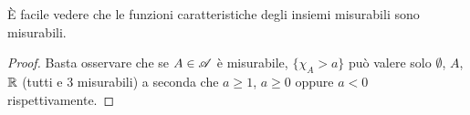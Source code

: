 \begin{remark}
	È facile vedere che le funzioni caratteristiche degli insiemi misurabili sono misurabili.
\end{remark}
\begin{proof}
	Basta osservare che se $A\in \mathscr A$ è misurabile, $\{ \chi_A > a\}$ può valere solo $\emptyset$, $A$, $\mathbb R$ (tutti e 3 misurabili) a seconda che
	$a\geq 1$, $a\geq 0$ oppure $a < 0$ rispettivamente.
\end{proof}
